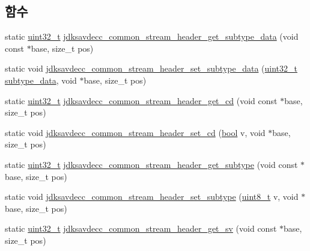 \subsection*{함수}
\begin{DoxyCompactItemize}
\item 
static \hyperlink{parse_8c_a6eb1e68cc391dd753bc8ce896dbb8315}{uint32\+\_\+t} \hyperlink{group__jdksavdecc__avtp__common__stream__header_ga40bb44e69a3f5cc31056860844aacd7f}{jdksavdecc\+\_\+common\+\_\+stream\+\_\+header\+\_\+get\+\_\+subtype\+\_\+data} (void const $\ast$base, size\+\_\+t pos)
\item 
static void \hyperlink{group__jdksavdecc__avtp__common__stream__header_ga1d7580ac3bd3b735f83e7b905c8ecff4}{jdksavdecc\+\_\+common\+\_\+stream\+\_\+header\+\_\+set\+\_\+subtype\+\_\+data} (\hyperlink{parse_8c_a6eb1e68cc391dd753bc8ce896dbb8315}{uint32\+\_\+t} \hyperlink{avtp_8h_a3210e9f18fdc9c29cef7600c4d1e67e9}{subtype\+\_\+data}, void $\ast$base, size\+\_\+t pos)
\item 
static \hyperlink{parse_8c_a6eb1e68cc391dd753bc8ce896dbb8315}{uint32\+\_\+t} \hyperlink{group__jdksavdecc__avtp__common__stream__header_ga98f7c7fff17b918c9e013b305c216d75}{jdksavdecc\+\_\+common\+\_\+stream\+\_\+header\+\_\+get\+\_\+cd} (void const $\ast$base, size\+\_\+t pos)
\item 
static void \hyperlink{group__jdksavdecc__avtp__common__stream__header_gab06ac14a62c3ba08ab44b292951cd8c7}{jdksavdecc\+\_\+common\+\_\+stream\+\_\+header\+\_\+set\+\_\+cd} (\hyperlink{avb__gptp_8h_af6a258d8f3ee5206d682d799316314b1}{bool} v, void $\ast$base, size\+\_\+t pos)
\item 
static \hyperlink{parse_8c_a6eb1e68cc391dd753bc8ce896dbb8315}{uint32\+\_\+t} \hyperlink{group__jdksavdecc__avtp__common__stream__header_ga2cdcfb7db5d4ad1335b8f69901640669}{jdksavdecc\+\_\+common\+\_\+stream\+\_\+header\+\_\+get\+\_\+subtype} (void const $\ast$base, size\+\_\+t pos)
\item 
static void \hyperlink{group__jdksavdecc__avtp__common__stream__header_ga2e824f81c53e17d197c4bbb0cd44879b}{jdksavdecc\+\_\+common\+\_\+stream\+\_\+header\+\_\+set\+\_\+subtype} (\hyperlink{stdint_8h_aba7bc1797add20fe3efdf37ced1182c5}{uint8\+\_\+t} v, void $\ast$base, size\+\_\+t pos)
\item 
static \hyperlink{parse_8c_a6eb1e68cc391dd753bc8ce896dbb8315}{uint32\+\_\+t} \hyperlink{group__jdksavdecc__avtp__common__stream__header_ga8823be5edad8bf3e382afa495e739ee8}{jdksavdecc\+\_\+common\+\_\+stream\+\_\+header\+\_\+get\+\_\+sv} (void const $\ast$base, size\+\_\+t pos)

\end{DoxyCompactItemize}
